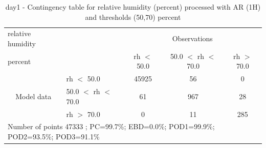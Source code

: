 \begin{table}[p!]
\begin{center}
\begin{tabular}{llccc}
\hline
{relative humidity}                                       &                                                    & \multicolumn{3}{c}{Observations}                 \\
{percent}                                       &                             & rh $<$ 50.0   & 50.0 $<$ rh $<$ 70.0 & rh $>$ 70.0 \\
\hline
\multicolumn{1}{c}{\multirow{3}{*}{Model data}}  & rh $<$ 50.0             & 45925                & 56                       & 0              \\
                                                 & 50.0  $<$ rh $<$ 70.0 & 61                & 967                       & 28              \\
                                                 & rh $>$ 70.0             & 0                & 11                       & 285              \\
\hline
\multicolumn{5}{l}{ Number of points        47333 ; PC=99.7\%; EBD=0.0\%; POD1=99.9\%; POD2=93.5\%; POD3=91.1\%}
\end{tabular}
\end{center}
\caption{day1 - Contingency table for  relative humidity (percent) processed with AR (1H) and thresholds (50,70) percent}
\label{tab:contingencyrhAFT:day1}
\end{table}
